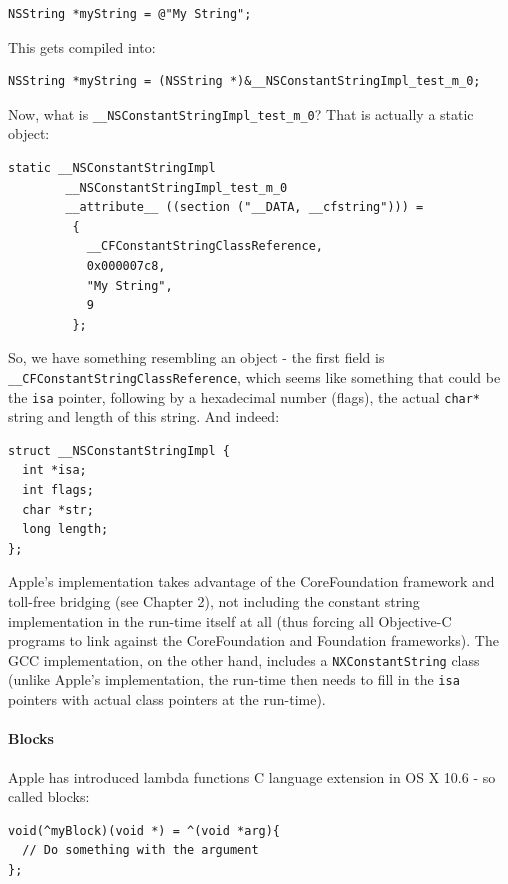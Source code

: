 \begin{verbatim}
NSString *myString = @"My String";
\end{verbatim}

This gets compiled into:

\begin{verbatim}
NSString *myString = (NSString *)&__NSConstantStringImpl_test_m_0;
\end{verbatim}

Now, what is \verb=__NSConstantStringImpl_test_m_0=? That is actually a static object:

\begin{verbatim}
static __NSConstantStringImpl 
        __NSConstantStringImpl_test_m_0 
        __attribute__ ((section ("__DATA, __cfstring"))) = 
         {
           __CFConstantStringClassReference,
           0x000007c8,
           "My String",
           9
         };
\end{verbatim}

So, we have something resembling an object - the first field is \newline{}\verb=__CFConstantStringClassReference=, which seems like something that could be the \verb=isa= pointer, following by a hexadecimal number (flags), the actual \verb=char*= string and length of this string. And indeed:

\begin{verbatim}
struct __NSConstantStringImpl {
  int *isa;
  int flags;
  char *str;
  long length;
};
\end{verbatim}

Apple's implementation takes advantage of the CoreFoundation framework and toll-free bridging (see Chapter 2), not including the constant string implementation in the run-time itself at all (thus forcing all Objective-C programs to link against the CoreFoundation and Foundation frameworks). The GCC implementation, on the other hand, includes a \verb=NXConstantString= class (unlike Apple's implementation, the run-time then needs to fill in the \verb=isa= pointers with actual class pointers at the run-time).

\paragraph{Blocks}

Apple has introduced lambda functions C language extension in OS X 10.6 - so called blocks:

\begin{verbatim}
void(^myBlock)(void *) = ^(void *arg){
  // Do something with the argument
};
\end{verbatim}

